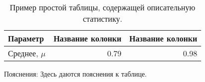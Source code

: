 \begin{table*}[!h]
\caption{Пример простой таблицы, содержащей описательную статистику.}
\label{tab:tab_descr_1}
\setlength{\arrayrulewidth}{1.05 pt}
\renewcommand{\arraystretch}{1.1}
\begin{tabular*}{1.0\textwidth}{@{\extracolsep{\fill}}lrr}
\hline
Параметр & Название колонки & Название колонки \\
\hline
Среднее, $\mu$ & 0.79 & 0.98 \\
\hline
\end{tabular*}
\begin{spacing}{0.5}
{\scriptsize Пояснения: Здесь даются пояснения к таблице.}
\end{spacing}
\end{table*}

